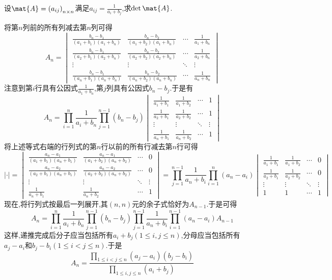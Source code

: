 \documentclass{ctexart}
\begin{document}
\begin{homework}[7(10')]
    设$\mat{A}=\left(a_{ij}\right)_{n\times n}$满足$a_{ij}=\frac{1}{a_i+b_j}$,求$\det\mat{A}$.
\end{homework}
\begin{solution}
    将第$n$列前的所有列减去第$n$列可得
    \[A_n=\begin{vmatrix}
        \frac{b_n-b_1}{\left(a_1+b_1\right)\left(a_1+b_n\right)}&\frac{b_n-b_2}{\left(a_1+b_2\right)\left(a_1+b_n\right)}&\cdots&\frac{1}{a_1+b_n}\\
        \frac{b_n-b_1}{\left(a_2+b_1\right)\left(a_2+b_n\right)}&\frac{b_n-b_2}{\left(a_2+b_2\right)\left(a_2+b_n\right)}&\cdots&\frac{1}{a_2+b_n}\\
        \vdots&\vdots&\ddots&\vdots\\
        \frac{b_n-b_1}{\left(a_n+b_1\right)\left(a_n+b_n\right)}&\frac{b_n-b_2}{\left(a_n+b_2\right)\left(a_n+b_n\right)}&\cdots&\frac{1}{a_n+b_n}
    \end{vmatrix}\]
    注意到第$i$行具有公因式$\frac{1}{a_1+b_n}$,第$j$列具有公因式$b_n-b_j$.于是有
    \[A_n=\prod_{i=1}^{n}\dfrac{1}{a_i+b_n}\prod_{j=1}^{n-1}\left(b_n-b_j\right)\begin{vmatrix}
        \frac{1}{a_1+b_1}&\frac{1}{a_1+b_2}&\cdots&1\\
        \frac{1}{a_2+b_1}&\frac{1}{a_2+b_2}&\cdots&1\\
        \vdots&\vdots&\ddots&\vdots\\
        \frac{1}{a_n+b_1}&\frac{1}{a_n+b_2}&\cdots&1
    \end{vmatrix}\]
    将上述等式右端的行列式的第$n$行以前的所有行减去第$n$行可得
    \[|\cdot|=\begin{vmatrix}
        \frac{a_n-a_1}{\left(a_1+b_1\right)\left(a_n+b_1\right)}&\frac{a_n-a_1}{\left(a_1+b_2\right)\left(a_n+b_2\right)}&\cdots&0\\
        \frac{a_n-a_2}{\left(a_2+b_1\right)\left(a_n+b_1\right)}&\frac{a_n-a_2}{\left(a_2+b_2\right)\left(a_n+b_2\right)}&\cdots&0\\
        \vdots&\vdots&\ddots&\vdots\\
        \frac{1}{a_n+b_1}&\frac{1}{a_n+b_2}&\cdots&1
    \end{vmatrix}=\prod_{j=1}^{n-1}\dfrac{1}{a_n+b_i}\prod_{i=1}^{n}\left(a_n-a_i\right)\begin{vmatrix}
        \frac{1}{a_1+b_1}&\frac{1}{a_1+b_2}&\cdots&0\\
        \frac{1}{a_2+b_1}&\frac{1}{a_2+b_2}&\cdots&0\\
        \vdots&\vdots&\ddots&\vdots\\
        1&1&\cdots&1
    \end{vmatrix}\]
    现在,将行列式按最后一列展开,其$(n,n)$元的余子式恰好为$A_{n-1}$.于是可得
    \[A_n=\prod_{i=1}^{n}\dfrac{1}{a_i+b_n}\prod_{j=1}^{n-1}\left(b_n-b_j\right)\prod_{j=1}^{n-1}\dfrac{1}{a_n+b_i}\prod_{i=1}^{n-1}\left(a_n-a_i\right)A_{n-1}\]
    这样,递推完成后分子应当包括所有$a_i+b_j(1\leq i,j\leq n)$,分母应当包括所有$a_j-a_i$和$b_j-b_i(1\leq i<j\leq n)$.于是
    \[A_n=\dfrac{\displaystyle\prod_{1\leqslant i<j\leqslant n}\left(a_j-a_i\right)\left(b_j-b_i\right)}{\displaystyle\prod_{1\leqslant i,j\leqslant n}\left(a_i+b_j\right)}\]
\end{solution}
\end{document}
